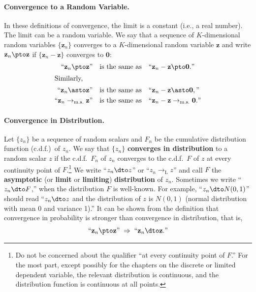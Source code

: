 \paragraph{Convergence to a Random Variable.}
In these definitions of convergence, the limit is a constant (i.e., a real number).
The limit can be a random variable.  We say that a sequence of $K$-dimensional
random variables $\{\mathbf{z}_n\}$ converges to a $K$-dimensional random variable
$\mathbf{z}$ and write $\mathbf{z}_n \pto \mathbf{z}$ if $\{\mathbf{z}_n - \mathbf{z}\}$
converges to $\mathbf{0}$:
\begin{align}
  \text{``}\mathbf{z}_n \pto \mathbf{z}\text{''} &\quad \text{is the same as} \quad
  \text{``}\mathbf{z}_n - \mathbf{z} \pto \mathbf{0}.\text{''} \label{eq:2.1.5a} \\
\intertext{Similarly,}
  \text{``}\mathbf{z}_n \asto \mathbf{z}\text{''} &\quad \text{is the same as} \quad
  \text{``}\mathbf{z}_n - \mathbf{z} \asto \mathbf{0},\text{''} \label{eq:2.1.5b} \\
  \text{``}\mathbf{z}_n \to_{\text{m.s.}} \mathbf{z}\text{''} &\quad \text{is the same as} \quad
  \text{``}\mathbf{z}_n - \mathbf{z} \to_{\text{m.s.}} \mathbf{0}.\text{''} \label{eq:2.1.5c}
\end{align}

\paragraph{Convergence in Distribution.}
Let $\{z_n\}$ be a sequence of random scalars and $F_n$ be the cumulative distribution
function (c.d.f.)\ of $z_n$.  We say that $\{z_n\}$ \textbf{converges in distribution}
to a random scalar $z$ if the c.d.f.\ $F_n$ of $z_n$ converges to the c.d.f.\ $F$ of
$z$ at every continuity point of $F$.\footnote{Do not be concerned about the
qualifier ``at every continuity point of $F$.''  For the most part, except possibly
for the chapters on the discrete or limited dependent variable, the relevant
distribution is continuous, and the distribution function is continuous at all points.}
We write ``$z_n \dto z$'' or ``$z_n \to_{\text{L}} z$'' and call $F$ the
\textbf{asymptotic} (or \textbf{limit} or \textbf{limiting}) \textbf{distribution}
of $z_n$.  Sometimes we write ``$z_n \dto F$,'' when the distribution $F$ is
well-known.  For example, ``$z_n \dto N(0,1)$'' should read ``$z_n \dto z$ and
the distribution of $z$ is $N(0,1)$ (normal distribution with mean 0 and variance 1).''
It can be shown from the definition that convergence in probability is stronger
than convergence in distribution, that is,
\begin{equation}
  \text{``}\mathbf{z}_n \pto \mathbf{z}\text{''} \;\Rightarrow\;
  \text{``}\mathbf{z}_n \dto \mathbf{z}.\text{''}
  \label{eq:2.1.6}
\end{equation}


